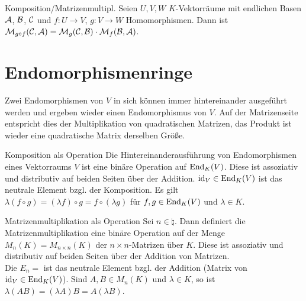\begin{Satz}{Komposition/Matrizenmultipl.}
    Seien $U, V, W$ $K$-Vektorräume mit endlichen Basen
    $\mathcal{A}$, $\mathcal{B}$, $\mathcal{C}$ und $f: U \rightarrow V$,
    $g: V \rightarrow W$ Homomorphismen.
    Dann ist $\mathcal{M}_{g \circ f}(\mathcal{C},\mathcal{A}) = \mathcal{M}_{g}(\mathcal{C},\mathcal{B}) \cdot
    \mathcal{M}_{f}(\mathcal{B},\mathcal{A})$.
\end{Satz}

\section{%
    Endomorphismenringe%
}

\begin{Bem}
    Zwei Endomorphismen von $V$ in sich können immer hintereinander ausgeführt
    werden und ergeben wieder einen Endomorphismus von $V$.
    Auf der Matrizenseite entspricht dies der Multiplikation von quadratischen
    Matrizen, das Produkt ist wieder eine quadratische Matrix derselben Größe.
\end{Bem}

\begin{Satz}{Komposition als Operation}
    Die Hintereinanderausführung von Endomorphismen eines Vektorraums $V$ ist
    eine binäre Operation auf $\operatorname{End}_K(V)$.
    Diese ist assoziativ und distributiv auf beiden Seiten über der Addition.
    $\operatorname{id}_V \in \operatorname{End}_K(V)$ ist das neutrale Element bzgl. der Komposition.
    Es gilt $\lambda (f \circ g) = (\lambda f) \circ g = f \circ (\lambda g)$
    für $f, g \in \operatorname{End}_K(V)$ und $\lambda \in K$.
\end{Satz}

\begin{Satz}{Matrizenmultiplikation als Operation}
    Sei $n \in \natural$.
    Dann definiert die Matrizenmultiplikation eine binäre Operation auf der
    Menge $M_n(K) = M_{n \times n}(K)$ der $n \times n$-Matrizen über $K$.
    Diese ist assoziativ und distributiv auf beiden Seiten über der Addition
    von Matrizen. \\
    Die  $E_n =$%
    ist das neutrale Element bzgl. der Addition
    (Matrix von $\operatorname{id}_V \in \operatorname{End}_K(V)$).
    Sind $A, B \in M_{n}(K)$ und $\lambda \in K$, so ist
    $\lambda (AB) = (\lambda A) B = A (\lambda B)$.
\end{Satz}

